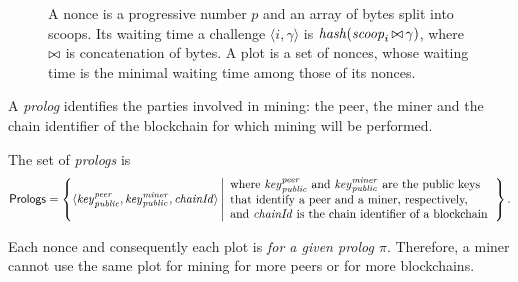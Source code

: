 \begin{figure}[t]
\begin{center}
  \end{center}
  \caption{A nonce is a progressive number $p$ and an array of bytes split into scoops.
    Its waiting time \wrt{} a challenge $\langle i,\gamma\rangle$ is ${\mathit{hash}}({\mathit{scoop}}_i\operatorname*{\bowtie}\gamma)$,
    where $\operatorname*{\bowtie}$ is concatenation of bytes.
    A plot is a set of nonces, whose waiting time
    is the minimal waiting time among those of its nonces.}\label{fig:waiting_time}
\end{figure}
%
A \emph{prolog} identifies the parties involved in mining: the peer, the miner
and the chain identifier of the blockchain for which mining will be performed.
%
\begin{definition}[Prolog]\label{def:prolog}
  The set of \emph{prologs} is
  \[
  {\mathsf{Prologs}}=\left\{\langle\mathit{key}_{\mathit{public}}^{\mathit{peer}},
  \mathit{key}_{\mathit{public}}^{\mathit{miner}},{\mathit{chainId}}\rangle\left|\begin{array}{l}
  \text{where $\mathit{key}_{\mathit{public}}^{\mathit{peer}}$
    and $\mathit{key}_{\mathit{public}}^{\mathit{miner}}$ are the public keys}\\
  \text{that identify a peer and a miner, respectively,}\\
  \text{and ${\mathit{chainId}}$ is the chain identifier of a blockchain}
  \end{array}\right.\right\}.
  \]
\end{definition}
%
Each nonce and consequently each plot is \emph{for a given prolog $\pi$}.
Therefore, a miner cannot use the same plot for mining for more peers or for more blockchains.
